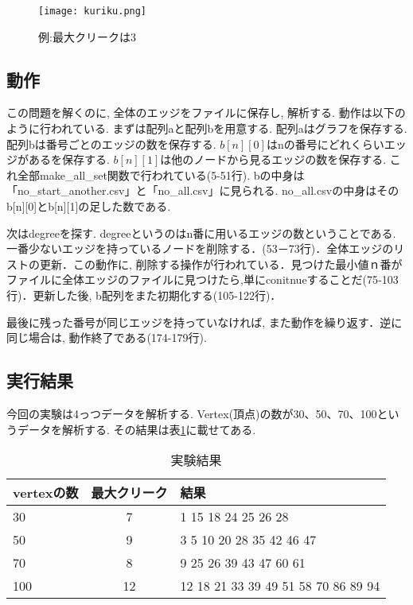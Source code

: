 \documentclass[a4j, titlepage]{jarticle}
\begin{document}
\begin{figure}[tbh]
    \centering \texttt{[image: kuriku.png]}
    \caption{例:最大クリークは3}
    \label{pic:kurikuirasuto}
\end{figure}

\subsection{動作}
この問題を解くのに, 全体のエッジをファイルに保存し, 解析する. 動作は以下のように行われている.  
まずは配列aと配列bを用意する. 配列aはグラフを保存する. 配列bは番号ごとのエッジの数を保存する. $b[n][0]$はnの番号にどれくらいエッジがあるを保存する. $b[n][1]$は他のノードから見るエッジの数を保存する. これ全部make\_all\_set関数で行われている(5-51行). bの中身は「no\_start\_another.csv」と「no\_all.csv」に見られる. no\_all.csvの中身はそのb[n][0]とb[n][1]の足した数である.

次はdegreeを探す. degreeというのはn番に用いるエッジの数ということである. 一番少ないエッジを持っているノードを削除する．(53－73行)．全体エッジのリストの更新．この動作に, 削除する操作が行われている．見つけた最小値ｎ番がファイルに全体エッジのファイルに見つけたら,単にconitnueすることだ(75‐103行)．更新した後, b配列をまた初期化する(105-122行)．

最後に残った番号が同じエッジを持っていなければ, また動作を繰り返す．逆に同じ場合は, 動作終了である(174-179行).
\pagebreak
\subsection{実行結果}
今回の実験は4っつデータを解析する. Vertex(頂点)の数が30、50、70、100というデータを解析する. その結果は表\ref{table:kuriku}に載せてある. 

\begin{table}[bth]
    \label{table:kuriku}
    \caption{実験結果}
    \begin{center}
    \begin{tabular}{|l|c|l|}
    \hline
    vertexの数 & 最大クリーク & 結果 \\ \hline
     30 &  7 &  1 15 18 24 25 26 28 \\ \hline
     50 &  9 &  3 5 10 20 28 35 42 46 47 \\ \hline
     70 &  8 &  9 25 26 39 43 47 60 61 \\ \hline
    100 & 12 & 12 18 21 33 39 49 51 58 70 86 89 94 \\ \hline
\end{tabular}
\end{center}
\end{table}
\end{document}
